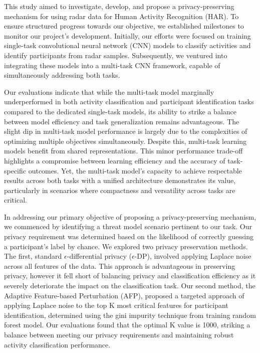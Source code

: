 \documentclass{l4proj}
\begin{document}
This study aimed to investigate, develop, and propose a privacy-preserving mechanism for using radar data for Human Activity Recognition (HAR). To ensure structured progress towards our objective, we established milestones to monitor our project's development. Initially, our efforts were focused on training single-task convolutional neural network (CNN) models to classify activities and identify participants from radar samples. Subsequently, we ventured into integrating these models into a multi-task CNN framework, capable of simultaneously addressing both tasks.

Our evaluations indicate that while the multi-task model marginally underperformed in both activity classification and participant identification tasks compared to the dedicated single-task models, its ability to strike a balance between model efficiency and task generalization remains advantageous. The slight dip in multi-task model performance is largely due to the complexities of optimizing multiple objectives simultaneously. Despite this, multi-task learning models benefit from shared representations. This minor performance trade-off highlights a compromise between learning efficiency and the accuracy of task-specific outcomes. Yet, the multi-task model's capacity to achieve respectable results across both tasks with a unified architecture demonstrates its value, particularly in scenarios where compactness and versatility across tasks are critical.

In addressing our primary objective of proposing a privacy-preserving mechanism, we commenced by identifying a threat model scenario pertinent to our task. Our privacy requirement was determined based on the likelihood of correctly guessing a participant's label by chance. We explored two privacy preservation methods. The first, standard $\epsilon$-differential privacy ($\epsilon$-DP), involved applying Laplace noise across all features of the data. This approach is advantageous in preserving privacy, however it fell short of balancing privacy and classification efficiency as it severely deteriorate the impact on the classification task. Our second method, the Adaptive Feature-based Perturbation (AFP), proposed a targeted approach of applying Laplace noise to the top K most critical features for participant identification, determined using the gini impurity technique from training random forest model. Our evaluations found that the optimal K value is 1000, striking a balance between meeting our privacy requirements and maintaining robust activity classification performance.
\end{document}
